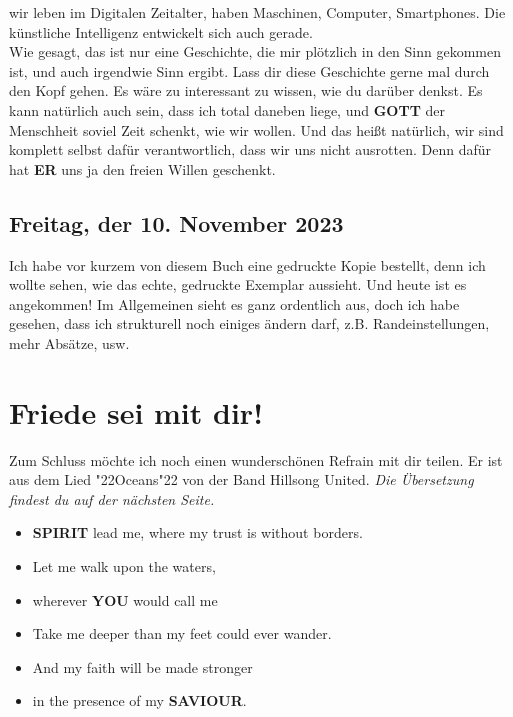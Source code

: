 \documentclass[12pt,a5paper]{article}
\newcommand{\Er}[0]{\textbf{ER}}
\newcommand{\Gott}[0]{\textbf{GOTT}}
\newcommand{\Saviour}[0]{\textbf{SAVIOUR}}
\newcommand{\Spirit}[0]{\textbf{SPIRIT}}
\newcommand{\You}[0]{\textbf{YOU}}
\newcommand{\q}[1]{\char"22{#1}\char"22 }
\begin{document}
		wir leben im Digitalen Zeitalter,
		haben Maschinen,
		Computer,
		Smartphones.
		Die k\"unstliche Intelligenz entwickelt sich auch gerade.
		\\
		Wie gesagt,
		das ist nur eine Geschichte,
		die mir pl\"otzlich in den Sinn gekommen ist,
		und auch irgendwie Sinn ergibt.
		Lass dir diese Geschichte gerne mal durch den Kopf gehen.
		Es w\"are zu interessant zu wissen,
		wie du dar\"uber denkst.
		Es kann nat\"urlich auch sein,
		dass ich total daneben liege,
		und {\Gott} der Menschheit soviel Zeit schenkt,
		wie wir wollen.
		Und das hei{\ss}t nat\"urlich,
		wir sind komplett selbst daf\"ur verantwortlich,
		dass wir uns nicht ausrotten.
		Denn daf\"ur hat {\Er} uns ja den freien Willen geschenkt.

	\subsection{Freitag, der 10. November 2023}
		Ich habe vor kurzem von diesem Buch eine gedruckte Kopie bestellt,
		denn ich wollte sehen,
		wie das echte, gedruckte Exemplar aussieht.
		Und heute ist es angekommen!
		Im Allgemeinen sieht es ganz ordentlich aus,
		doch ich habe gesehen,
		dass ich strukturell noch einiges \"andern darf,
		z.B. Randeinstellungen,
		mehr Abs\"atze,
		usw.
		
	\newpage
	\section{Friede sei mit dir!}
		Zum Schluss m\"ochte ich noch einen wundersch\"onen Refrain mit dir teilen.
		Er ist aus dem Lied \q{Oceans} von der Band Hillsong United.
		\textit{Die \"Ubersetzung findest du auf der n\"achsten Seite.}
		\\
		\begin{itemize}[nosep]
			\item[]	{\Spirit} lead me,
					where my trust is without borders.
			\item[]	Let me walk upon the waters,
			\item[]	wherever {\You} would call me
			\item[]	Take me deeper than my feet could ever wander.
			\item[]	And my faith will be made stronger
			\item[]	in the presence of my {\Saviour}.
					\\
		\end{itemize}
\end{document}
